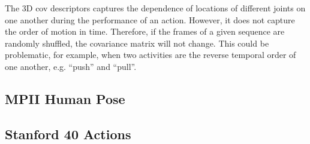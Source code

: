 \documentclass{article}
\begin{document}
The 3D cov descriptors captures the dependence of locations
of different joints on one another during the performance of
an action. However, it does not capture the order of motion
in time. Therefore, if the frames of a given sequence are randomly
shuffled, the covariance matrix will not change. This
could be problematic, for example, when two activities are
the reverse temporal order of one another, e.g. “push” and “pull”.

\subsection{MPII Human Pose}
\subsection{Stanford 40 Actions}
\end{document}
